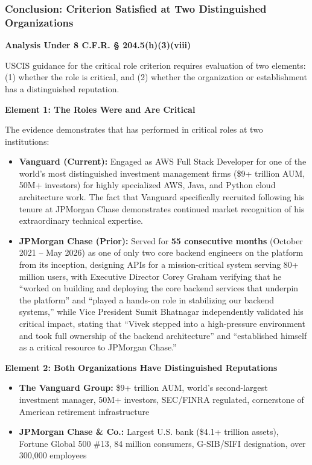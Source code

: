 
\subsubsection{Conclusion: Criterion Satisfied at Two Distinguished Organizations}
\label{critical:conclusion}

\textbf{Analysis Under 8 C.F.R. § 204.5(h)(3)(viii)}

USCIS guidance for the critical role criterion requires evaluation of two elements: (1) whether the role is critical, and (2) whether the organization or establishment has a distinguished reputation.

\textbf{Element 1: The Roles Were and Are Critical}

The evidence demonstrates that \dr has performed in critical roles at two institutions:

\begin{itemize}
    \item \textbf{Vanguard (Current):} Engaged as AWS Full Stack Developer for one of the world's most distinguished investment management firms (\$9+ trillion AUM, 50M+ investors) for highly specialized AWS, Java, and Python cloud architecture work. The fact that Vanguard specifically recruited \dr following his tenure at JPMorgan Chase demonstrates continued market recognition of his extraordinary technical expertise.

    \item \textbf{JPMorgan Chase (Prior):} Served for \textbf{55 consecutive months} (October 2021 -- May 2026) as one of only two core backend engineers on the platform from its inception, designing APIs for a mission-critical system serving 80+ million users, with Executive Director Corey Graham verifying that he ``worked on building and deploying the core backend services that underpin the platform'' and ``played a hands-on role in stabilizing our backend systems,'' while Vice President Sumit Bhatnagar independently validated his critical impact, stating that ``Vivek stepped into a high-pressure environment and took full ownership of the backend architecture'' and ``established himself as a critical resource to JPMorgan Chase.''
\end{itemize}

\textbf{Element 2: Both Organizations Have Distinguished Reputations}

\begin{itemize}
    \item \textbf{The Vanguard Group:} \$9+ trillion AUM, world's second-largest investment manager, 50M+ investors, SEC/FINRA regulated, cornerstone of American retirement infrastructure
    \item \textbf{JPMorgan Chase \& Co.:} Largest U.S. bank (\$4.1+ trillion assets), Fortune Global 500 \#13, 84 million consumers, G-SIB/SIFI designation, over 300,000 employees
\end{itemize}

